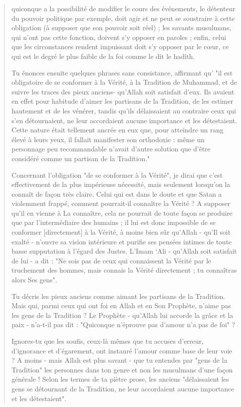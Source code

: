 \begin{quote}
quiconque a la possibilité de modifier le cours des événements, le
détenteur du pouvoir politique par exemple, doit agir et ne peut se
soustraire à cette obligation (à supposer que son pouvoir soit réel) ;
les savants musulmans, qui n'ont pas cette fonction, doivent s'y opposer
en paroles ; enfin, celui que les circonstances rendent impuissant doit
s'y opposer par le cœur, ce qui est le degré le plus faible de la foi
comme le dit le hadîth.

Tu énonces ensuite quelques phrases sans consistance, affirmant qu' "il
est obligatoire de se conformer à la Vérité, à la Tradition de Muhammad,
et de suivre les traces des pieux anciens- qu'Allah soit satisfait
d'eux. Ils avaient en effet pour habitude d'aimer les partisans de la
Tradition, de les estimer hautement et de les vénérer, tandis qu'ils
délaissaient au contraire ceux qui s'en détournaient, ne leur
accordaient aucune importance et les détestaient. Cette nature était
tellement ancrée en eux que, pour atteindre un rang élevé à leurs yeux,
il fallait manifester son orthodoxie : même un personnage peu
recommandable n'avait d'autre solution que d'être considéré comme un
partisan de la Tradition."

Concernant l'obligation "de se conformer à la Vérité", je dirai que
c'est effectivement de la plus impérieuse nécessité, mais seulement
lorsqu'on la connaît de façon très claire. Celui qui est dans le doute
et que Satan a violemment frappé, comment pourrait-il connaître la
Vérité ? A supposer qu'il en vienne à La connaître, cela ne pourrait de
toute façon se produire que par l'intermédiaire des humains ; il lui est
donc impossible de se conformer {[}directement{]} à la Vérité, à moins
bien sûr qu'Allah - qu'Il soit exalté - n'ouvre sa vision intérieure et
purifie ses pensées intimes de toute basse supputation à l'égard des
Justes. L'Imam `Ali - qu'Allah soit satisfait de lui - a dit : "Ne sois
pas de ceux qui connaissent la Vérité par le truchement des hommes, mais
connais la Vérité directement ; tu connaîtras alors Ses gens".

Tu décris les pieux anciens comme aimant les partisans de la Tradition.
Mais qui, parmi ceux qui ont foi en Allah et en Son Prophète, n'aime pas
les gens de la Tradition ? Le Prophète - qu'Allah lui accorde la grâce
et la paix - n'a-t-il pas dit : "Quiconque n'éprouve pas d'amour n'a pas
de foi" ?

Ignores-tu que les soufis, ceux-là mêmes que tu accuses d'erreur,
d'ignorance et d'égarement, ont instauré l'amour comme base de leur voie
? A moins - mais Allah est plus savant - que tu entendes par "gens de la
Tradition" les personnes dans ton genre et non les musulmans d'une façon
générale ! Selon les termes de ta piètre prose, les anciens
"délaissaient les gens se détournant de la Tradition, ne leur
accordaient aucune importance et les détestaient".


\end{quote}

